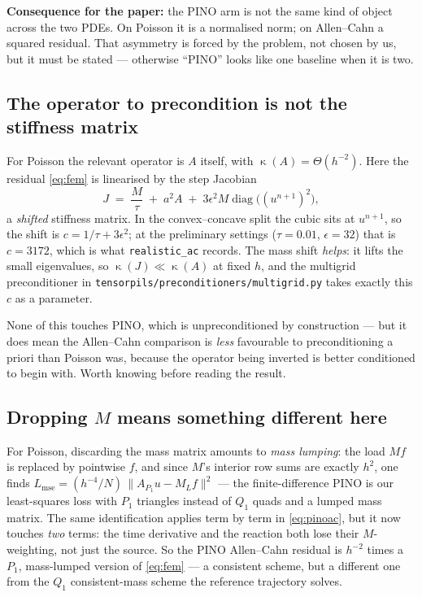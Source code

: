 \documentclass[11pt]{article}
\newcommand{\dt}{\tau}
\DeclareMathOperator{\cond}{\kappa}
\begin{document}
\textbf{Consequence for the paper:} the PINO arm is not the same kind of object across the two
PDEs. On Poisson it is a normalised norm; on Allen--Cahn a squared residual. That asymmetry is
forced by the problem, not chosen by us, but it must be stated --- otherwise ``PINO'' looks like
one baseline when it is two.

\subsection{The operator to precondition is not the stiffness matrix}

For Poisson the relevant operator is $A$ itself, with $\cond(A)=\Theta(h^{-2})$. Here the residual
\eqref{eq:fem} is linearised by the step Jacobian
\begin{equation}
  J \;=\; \frac{M}{\dt} \;+\; a^2 A \;+\; 3\epsilon^2 M \operatorname{diag}\bigl((u^{n+1})^2\bigr),
\end{equation}
a \emph{shifted} stiffness matrix. In the convex--concave split the cubic sits at $u^{n+1}$, so the
shift is $c = 1/\dt + 3\epsilon^2$; at the preliminary settings ($\dt=0.01$, $\epsilon=32$) that is
$c = 3172$, which is what \texttt{realistic\_ac} records. The mass shift \emph{helps}: it lifts the
small eigenvalues, so $\cond(J) \ll \cond(A)$ at fixed $h$, and the multigrid preconditioner in
\texttt{tensorpils/preconditioners/multigrid.py} takes exactly this $c$ as a parameter.

None of this touches PINO, which is unpreconditioned by construction --- but it does mean the
Allen--Cahn comparison is \emph{less} favourable to preconditioning a priori than Poisson was,
because the operator being inverted is better conditioned to begin with. Worth knowing before
reading the result.

\subsection{Dropping $M$ means something different here}

For Poisson, discarding the mass matrix amounts to \emph{mass lumping}: the load $Mf$ is replaced
by pointwise $f$, and since $M$'s interior row sums are exactly $h^2$, one finds
$L_{\mathrm{mse}} = (h^{-4}/N)\,\|A_{P_1}u - M_L f\|^2$ --- the finite-difference PINO is our
least-squares loss with $P_1$ triangles instead of $Q_1$ quads and a lumped mass matrix. The same
identification applies term by term in \eqref{eq:pinoac}, but it now touches \emph{two} terms: the
time derivative and the reaction both lose their $M$-weighting, not just the source. So the PINO
Allen--Cahn residual is $h^{-2}$ times a $P_1$, mass-lumped version of \eqref{eq:fem} --- a
consistent scheme, but a different one from the $Q_1$ consistent-mass scheme the reference
trajectory solves.
\end{document}
